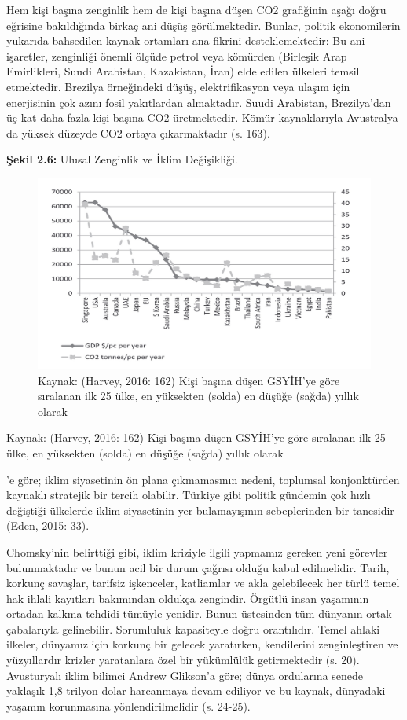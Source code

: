 \documentclass[
]{book}
\begin{document}
Hem kişi başına zenginlik hem de kişi başına düşen CO2 grafiğinin aşağı doğru eğrisine bakıldığında birkaç ani düşüş görülmektedir. Bunlar, politik ekonomilerin yukarıda bahsedilen kaynak ortamları ana fikrini desteklemektedir: Bu ani işaretler, zenginliği önemli ölçüde petrol veya kömürden (Birleşik Arap Emirlikleri, Suudi Arabistan, Kazakistan, İran) elde edilen ülkeleri temsil etmektedir. Brezilya örneğindeki düşüş, elektrifikasyon veya ulaşım için enerjisinin çok azını fosil yakıtlardan almaktadır. Suudi Arabistan, Brezilya'dan üç kat daha fazla kişi başına CO2 üretmektedir. Kömür kaynaklarıyla Avustralya da yüksek düzeyde CO2 ortaya çıkarmaktadır (s. 163). \citep{harvey2016climate}

\textbf{Şekil 2.6:} Ulusal Zenginlik ve İklim Değişikliği.

\begin{figure}
\includegraphics[width=0.95\linewidth,height=0.95\textheight]{tablolar-sekiller/sekil-2-6} \caption{Kaynak: (Harvey, 2016: 162) Kişi başına düşen GSYİH'ye göre sıralanan ilk 25 ülke, en yüksekten (solda) en düşüğe (sağda) yıllık olarak}\label{fig:unnamed-chunk-7}
\end{figure}

Kaynak: (Harvey, 2016: 162) Kişi başına düşen GSYİH'ye göre sıralanan ilk 25 ülke, en yüksekten (solda) en düşüğe (sağda) yıllık olarak

\citet{eden2015iklim}'e göre; iklim siyasetinin ön plana çıkmamasının nedeni, toplumsal konjonktürden kaynaklı stratejik bir tercih olabilir. Türkiye gibi politik gündemin çok hızlı değiştiği ülkelerde iklim siyasetinin yer bulamayışının sebeplerinden bir tanesidir (Eden, 2015: 33).

Chomsky'nin belirttiği gibi, iklim kriziyle ilgili yapmamız gereken yeni görevler bulunmaktadır ve bunun acil bir durum çağrısı olduğu kabul edilmelidir. Tarih, korkunç savaşlar, tarifsiz işkenceler, katliamlar ve akla gelebilecek her türlü temel hak ihlali kayıtları bakımından oldukça zengindir. Örgütlü insan yaşamının ortadan kalkma tehdidi tümüyle yenidir. Bunun üstesinden tüm dünyanın ortak çabalarıyla gelinebilir. Sorumluluk kapasiteyle doğru orantılıdır. Temel ahlaki ilkeler, dünyamız için korkunç bir gelecek yaratırken, kendilerini zenginleştiren ve yüzyıllardır krizler yaratanlara özel bir yükümlülük getirmektedir (s. 20). \citep{chomsky2020} Avusturyalı iklim bilimci Andrew Glikson'a göre; dünya ordularına senede yaklaşık 1,8 trilyon dolar harcanmaya devam ediliyor ve bu kaynak, dünyadaki yaşamın korunmasına yönlendirilmelidir (s. 24-25). \citep{chomsky2020}
\end{document}
